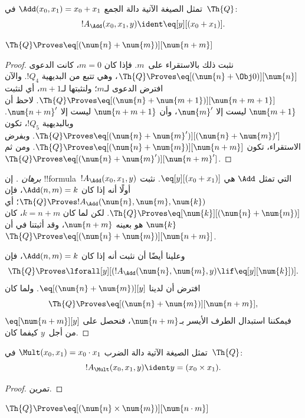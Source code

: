\documentclass[../../../include/open-logic-section]{subfiles}
\begin{document}
\begin{prop}
تمثل الصيغة الآتية دالة الجمع $\Add(x_0,x_1)=x_0+x_1$ في~$\Th{Q}$:
\[
  !A_{\Add}(x_0, x_1, y) \ident \eq[y][(x_0 + x_1)].
\]
\end{prop}

\begin{lem}
$\Th{Q} \Proves \eq[(\num{n} + \num{m})][\num{n+m}]$
\end{lem}

\begin{proof}
نثبت ذلك بالاستقراء على~$m$. فإذا كان $m=0$، كانت الدعوى
$\Th{Q}\Proves\eq[(\num{n}+\Obj 0)][\num{n}]$، وهي تتبع من البديهية
$!Q_4$. والآن افترض الدعوى لـ$m$؛ ولنثبتها لـ$m+1$، أي لنثبت
$\Th{Q}\Proves\eq[(\num{n}+\num{m+1})][\num{n+m+1}]$. لاحظ أن
$\num{m+1}$ ليست إلا $\num{m}'$، وأن $\num{n+m+1}$ ليست إلا
$\num{n+m}'$. وبالبديهية $!Q_5$، تكون
$\Th{Q}\Proves\eq[(\num{n}+\num{m}')][(\num{n}+\num{m})']$. وبفرض
الاستقراء، تكون
$\Th{Q}\Proves\eq[(\num{n}+\num{m})][\num{n+m}]$. ومن ثم
$\Th{Q}\Proves\eq[(\num{n}+\num{m}')][\num{n+m}']$.
\end{proof}

\begin{proof}[برهان ]
إن !!{formula}~$!A_\Add(x_0,x_1,y)$ التي تمثل $\Add$ هي
$\eq[y][(x_0+x_1)]$. نثبت أولًا أنه إذا كان $\Add(n,m)=k$، فإن
$\Th{Q}\Proves !A_\Add(\num{n},\num{m},\num{k})$؛ أي
$\Th{Q}\Proves\eq[\num{k}][(\num{n}+\num{m})]$. لكن لما كان
$k=n+m$، كان $\num{k}$ هو بعينه $\num{n+m}$، وقد أثبتنا في
 أن
$\Th{Q}\Proves\eq[(\num{n}+\num{m})][\num{n+m}]$.

وعلينا أيضًا أن نثبت أنه إذا كان $\Add(n,m)=k$، فإن
\[
\Th{Q} \Proves \lforall[y][(!A_\Add(\num{n}, \num{m}, y) \lif
  \eq[y][\num{k}])].
\]
افترض أن لدينا $\eq[(\num{n}+\num{m})][y]$. ولما كان
\[
\Th{Q} \Proves \eq[(\num{n}+\num{m})][\num{n+m}],
\]
فيمكننا استبدال الطرف الأيسر بـ$\num{n+m}$، فنحصل على
$\eq[\num{n+m}][y]$ من أجل~$y$ كيفما كان.
\end{proof}

\begin{prop}
تمثل الصيغة الآتية دالة الضرب
$\Mult(x_0,x_1)=x_0\cdot x_1$ في~$\Th{Q}$:
\[
  !A_{\Mult}(x_0, x_1, y) \ident y = (x_0 \times x_1).
\]
\end{prop}

\begin{proof} تمرين. \end{proof}

\begin{lem}
$\Th{Q} \Proves \eq[(\num{n} \times \num{m})][\num{n \cdot m}]$
\end{lem}
\end{document}
